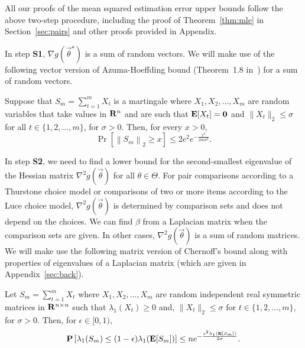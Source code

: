 All our proofs of the mean squared estimation error upper bounds follow the above two-step procedure, including the proof of Theorem~\ref{thm:mle} in Section~\ref{sec:pairs} and other proofs provided in Appendix. 

In step {\bf S1}, $\nabla g(\vec{\theta}^\star)$ is a sum of random vectors. We will make use of the following vector version of Azuma-Hoeffding bound (Theorem~1.8 in~\cite{H03}) for a sum of random vectors.

\begin{lemma} Suppose that $S_m = \sum_{t=1}^m X_t$ is a martingale where $X_1, X_2, \ldots, X_m$ are random variables that take values in $\mathbf{R}^n$ and are such that $\mathbf{E}[X_t] = \mathbf{0}$ and $\|X_t\|_2 \leq \sigma$ for all $t\in \{1,2,\ldots,m\}$, for $\sigma > 0$. Then, for every $x > 0$,
$$
\Pr\left[\left\|S_m\right\|_2 \geq x\right] \leq 2e^2 e^{-\frac{x^2}{2m \sigma^2}}.
$$
\label{prop:azuma-hoeffding}
\end{lemma}

In step {\bf S2}, we need to find a lower bound for the second-smallest eigenvalue of the Hessian matrix $\nabla^2 g(\vec{\theta})$ for all $\theta \in \Theta$. For pair comparisons according to a Thurstone choice model or comparisons of two or more items according to the Luce choice model, $\nabla^2 g(\vec{\theta})$ is determined by comparison sets and does not depend on the choices. We can find $\beta$ from a Laplacian matrix when the comparison sets are given. In other cases, $\nabla^2 g(\vec{\theta})$ is a sum of random matrices. We will make use the following matrix version of Chernoff's bound along with properties of eigenvalues of a Laplacian matrix (which are given in Appendix~\ref{sec:back}).

\begin{lemma} Let $S_m = \sum_{t=1}^m X_t$ where $X_1, X_2, \ldots, X_m$ are random independent real symmetric matrices in $\mathbf{R}^{n\times n}$ such that $\lambda_1 (X_t)\ge 0$ and, $\| X_t \|_2 \le \sigma$ for $t \in \{1,2,\ldots,m\}$, for $\sigma > 0$. Then, for $\epsilon \in [0,1)$,
$$
\mathbf{P}\left[ \lambda_{1}(S_m) \le (1-\epsilon) \lambda_1(\mathbf{E}[S_m]) \right] \leq n e^{-\frac{\epsilon^2\lambda_1(\mathbf{E}[S_m])}{2\sigma}}.
$$
\label{cor:matrix}
\end{lemma}
